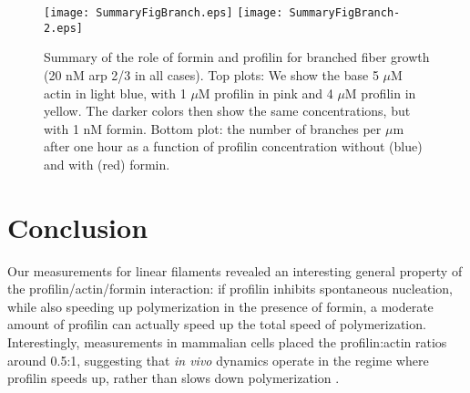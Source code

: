 \documentclass[11pt]{article}
\begin{document}
\begin{figure}
\centering
\texttt{[image: SummaryFigBranch.eps]}
\texttt{[image: SummaryFigBranch-2.eps]}
\caption{\label{fig:SumPlotBr}Summary of the role of formin and profilin for branched fiber growth (20 nM arp 2/3 in all cases). Top plots: We show the base 5 $\mu$M actin in light blue, with 1 $\mu$M profilin in pink and 4 $\mu$M profilin in yellow. The darker colors then show the same concentrations, but with 1 nM formin. Bottom plot: the number of branches per $\mu$m after one hour as a function of profilin concentration without (blue) and with (red) formin.}
\end{figure}

\section{Conclusion}
Our measurements for linear filaments revealed an interesting general property of the profilin/actin/formin interaction: if profilin inhibits spontaneous nucleation, while also speeding up polymerization in the presence of formin, a moderate amount of profilin can actually speed up the total speed of polymerization. Interestingly, measurements in mammalian cells placed the profilin:actin ratios around 0.5:1, suggesting that \emph{in vivo} dynamics operate in the regime where profilin speeds up, rather than slows down polymerization \cite{funk2019profilin}.
\end{document}
